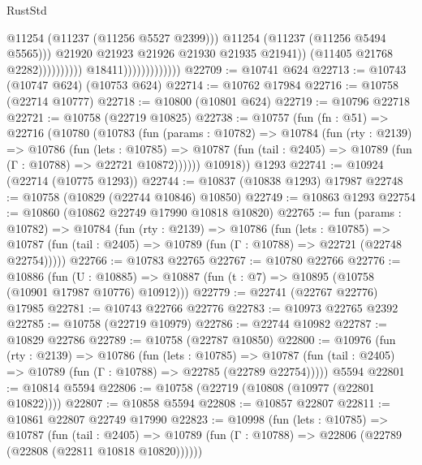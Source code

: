 \begin{lexlean}{RustStd}
\begin{coremodule}
                                                        @11254
                                                        (@11237 (@11256 @5527 @2399)))
                                                      @11254
                                                      (@11237 (@11256 @5494 @5565)))
                                                    @21920
                                                    @21923
                                                    @21926
                                                    @21930
                                                    @21935
                                                    @21941))
                                                (@11405 @21768 @2282))))))))))
                              @18411)))))))))))))
@22709 := @10741 @624
@22713 := @10743 (@10747 @624) (@10753 @624)
@22714 := @10762 @17984
@22716 := @10758 (@22714 @10777)
@22718 := @10800 (@10801 @624)
@22719 := @10796 @22718
@22721 := @10758 (@22719 @10825)
@22738 := @10757
    (fun (fn : @51) =>
    @22716
      (@10780
        (@10783
          (fun (params : @10782) =>
          @10784
            (fun (rty : @2139) =>
            @10786
              (fun (lets : @10785) =>
              @10787 (fun (tail : @2405) => @10789 (fun (Γ : @10788) => @22721 @10872))))))
        @10918))
    @1293
@22741 := @10924 (@22714 (@10775 @1293))
@22744 := @10837 (@10838 @1293) @17987
@22748 := @10758 (@10829 (@22744 @10846) @10850)
@22749 := @10863 @1293
@22754 := @10860 (@10862 @22749 @17990 @10818 @10820)
@22765 := fun (params : @10782) =>
  @10784
    (fun (rty : @2139) =>
    @10786
      (fun (lets : @10785) =>
      @10787 (fun (tail : @2405) => @10789 (fun (Γ : @10788) => @22721 (@22748 @22754)))))
@22766 := @10783 @22765
@22767 := @10780 @22766
@22776 := @10886
    (fun (U : @10885) => @10887 (fun (t : @7) => @10895 (@10758 (@10901 @17987 @10776) @10912)))
@22779 := @22741 (@22767 @22776) @17985
@22781 := @10743 @22766 @22776
@22783 := @10973 @22765 @2392
@22785 := @10758 (@22719 @10979)
@22786 := @22744 @10982
@22787 := @10829 @22786
@22789 := @10758 (@22787 @10850)
@22800 := @10976
    (fun (rty : @2139) =>
    @10786
      (fun (lets : @10785) =>
      @10787 (fun (tail : @2405) => @10789 (fun (Γ : @10788) => @22785 (@22789 @22754)))))
    @5594
@22801 := @10814 @5594
@22806 := @10758 (@22719 (@10808 (@10977 (@22801 @10822))))
@22807 := @10858 @5594
@22808 := @10857 @22807
@22811 := @10861 @22807 @22749 @17990
@22823 := @10998
    (fun (lets : @10785) =>
    @10787
      (fun (tail : @2405) =>
      @10789 (fun (Γ : @10788) => @22806 (@22789 (@22808 (@22811 @10818 @10820))))))

\end{coremodule}
\end{lexlean}
